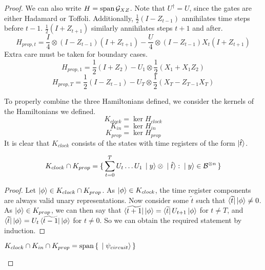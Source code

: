 \begin{proof}
	We can also write $H=\operatorname*{\operatorname{span}}\mathcal{G}_{XZ}$. Note that $U^\dagger=U$, since the gates are either Hadamard or Toffoli. Additionally, $\frac{1}{2}(I-Z_{t-1})$ annihilates time steps before $t-1$. $\frac{1}{2}(I+Z_{t+1})$ similarly annihilates steps $t+1$ and after.
	$$H_{prop,t}=\frac{I}{4}\otimes(I-Z_{t-1})(I+Z_{t+1})-\frac{U}{4}\otimes(I-Z_{t-1})X_t(I+Z_{t+1})$$
	Extra care must be taken for boundary cases.
	$$H_{prop,1}=\frac{1}{2}(I+Z_2)-U_1\otimes\frac{1}{2}(X_1+X_1Z_2)$$
	$$H_{prop,T}=\frac{1}{2}(I-Z_{t-1})-U_T\otimes\frac{1}{2}(X_T-Z_{T-1}X_T)$$

	To properly combine the three Hamiltonians defined, we consider the kernels of the Hamiltonians we defined.
	$$K_{clock}=\ker H_{clock}$$
	$$K_{in}=\ker H_{in}$$
	$$K_{prop}=\ker H_{prop}$$
	It is clear that $K_{clock}$ consists of the states with time registers of the form $\ket{\hat{t}}$.

	\begin{lemma}
		$$K_{clock}\cap K_{prop}=\set{\sum_{t=0}^TU_t\ldots U_1\ket{y}\otimes\ket{\hat{t}}: \ket{y}\in\mathcal{B}^{\otimes n}}$$
	\end{lemma}

	\begin{proof}
		Let $\ket\phi\in K_{clock}\cap K_{prop}$. As $\ket\phi\in K_{clock}$, the time register components are always valid unary representations. Now consider some $\widetilde{t}$ such that $\bra{\widetilde{t}}\ket\phi\ne0$. As $\ket\phi\in K_{prop}$, we can then say that $\bra{\widetilde{t+1}}\ket\phi=\bra{\widetilde{t}}U_{t+1}\ket\phi$ for $t\ne T$, and $\bra{\widetilde{t}}\ket\phi=U_t\bra{\widetilde{t-1}}\ket\phi$ for $t\ne0$. So we can obtain the required statement by induction.
	\end{proof}

	\begin{corollary}
		$K_{clock}\cap K_{in}\cap K_{prop}=\operatorname*{\operatorname{span}}\set{\ket{\psi_{circuit}}}$
	\end{corollary}


\end{proof}
